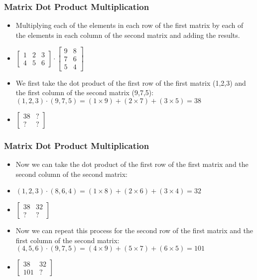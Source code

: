 \begin{frame}[fragile] \frametitle{Matrix Dot Product Multiplication}
\begin{itemize}
\item  Multiplying each of the elements in each row of the first matrix by each of the elements in each column of the second matrix and adding the results.
\item  $\begin{bmatrix}1 & 2 & 3 \\4 & 5 & 6\end{bmatrix} \cdot \begin{bmatrix}9 & 8 \\ 7 & 6 \\ 5 & 4\end{bmatrix}$
\item  We first take the dot product of the first row of the first matrix (1,2,3) and the first column of the second matrix (9,7,5):
$(1,2,3) \cdot (9,7,5) = (1 \times 9) + (2 \times 7) + (3 \times 5) = 38$
\item $\begin{bmatrix}38 & ?\\? & ?\end{bmatrix}$
\end{itemize}
\end{frame}

 \begin{frame}[fragile] \frametitle{Matrix Dot Product Multiplication}
\begin{itemize}
\item  Now we can take the dot product of the first row of the first matrix and the second column of the second matrix:
\item $(1,2,3) \cdot (8,6,4) = (1 \times 8) + (2 \times 6) + (3 \times 4) = 32$
\item $\begin{bmatrix}38 & 32\\? & ?\end{bmatrix} $
\item Now we can repeat this process for the second row of the first matrix and the first column of the second matrix: 
$(4,5,6) \cdot (9,7,5) = (4 \times 9) + (5 \times 7) + (6 \times 5) = 101$
\item $\begin{bmatrix}38 & 32\\101 & ?\end{bmatrix}$
\end{itemize}
\end{frame}

